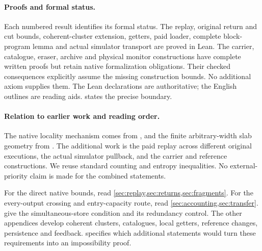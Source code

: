 \paragraph{Proofs and formal status.}
Each numbered result identifies its formal status. The replay, original
return and cut bounds, coherent-cluster extension, getters, paid loader,
complete block-program lemma and actual simulator transport are proved
in Lean. The carrier, catalogue, eraser, archive and physical monitor
constructions have complete written proofs but retain native formalization
obligations. Their checked consequences explicitly assume the missing
construction bounds. No additional axiom supplies them.
The Lean declarations are authoritative; the English outlines are reading
aids.  states the precise boundary.

\paragraph{Relation to earlier work and reading order.}
The native locality mechanism comes from \cite{FirstPaper2026}, and the
finite arbitrary-width slab geometry from \cite{MacroscopicCrossings2026}.
The additional work is the paid replay across different original executions,
the actual simulator pullback, and the carrier and reference constructions.
We reuse standard counting and entropy inequalities. No external-priority
claim is made for the combined statements.

For the direct native bounds, read \cref{sec:replay,sec:returns,sec:fragments}.
For the every-output crossing and entry-capacity route, read
\cref{sec:accounting,sec:transfer}. 
give the simultaneous-store condition and its redundancy control.
The other appendices develop coherent clusters, catalogues, local getters,
reference changes, persistence and feedback.  specifies
which additional statements would turn these requirements into an
impossibility proof.
